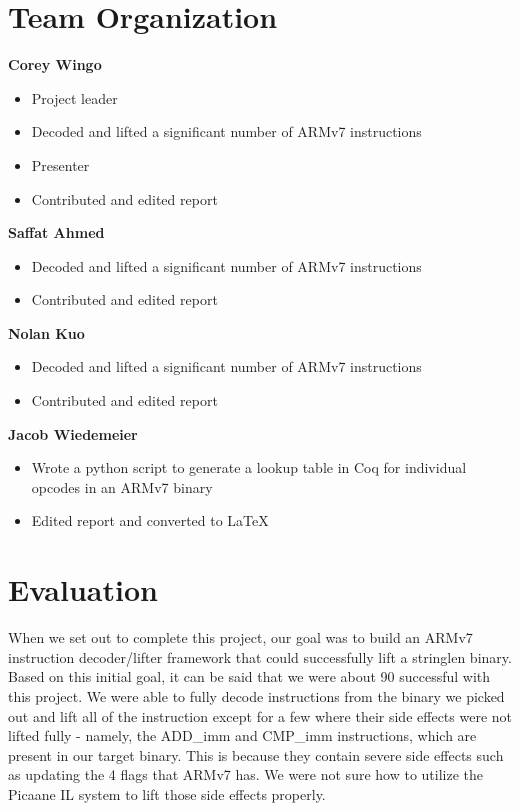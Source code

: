 \documentclass[twocolumn]{article}
\begin{document}
\newpage
\section*{\centering Team Organization}
\vspace{0.3cm}

\textbf{Corey Wingo}
\begin{itemize}
	\item Project leader
	\item Decoded and lifted a significant number of ARMv7 instructions
	\item Presenter
 \item Contributed and edited report\\
\end{itemize}


\textbf{Saffat Ahmed}
\begin{itemize}
	\item Decoded and lifted a significant number of ARMv7 instructions
  \item Contributed and edited report \\
\end{itemize}

\textbf{Nolan Kuo}
\begin{itemize}
	\item Decoded and lifted a significant number of ARMv7 instructions
  \item Contributed and edited report\\
\end{itemize}

\textbf{Jacob Wiedemeier}
\begin{itemize}
	\item Wrote a python script to generate a lookup table in Coq for individual opcodes in an ARMv7 binary
	\item Edited report and converted to LaTeX\\
\end{itemize}

\section*{\centering Evaluation}
\vspace{0.3cm}
When we set out to complete this project, our goal was to build an ARMv7 instruction decoder/lifter framework that could successfully lift a stringlen binary. Based on this initial goal, it can be said that we were about 90\text{\%} successful with this project. We were able to fully decode instructions from the binary we picked out and lift all of the instruction except for a few where their side effects were not lifted fully - namely, the ADD\_imm and CMP\_imm instructions, which are present in our target binary. This is because they contain severe side effects such as updating the 4 flags that ARMv7 has. We were not sure how to utilize the Picaane IL system to lift those side effects properly. \\
\end{document}

